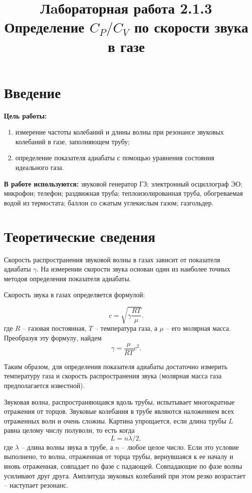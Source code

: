 \documentclass{article}
\date{}
\author{}
\title{Лaбораторная работа 2.1.3 \\ Определение $C_P/C_V$ по скорости звука в газе}
\begin{document}
\maketitle

\section*{Введение}
\textbf{Цель работы:}  \begin{enumerate}
	\item измерение частоты колебаний и длины волны при резонансе звуковых колебаний в газе, заполняющем трубу;
	\item определение показателя адиабаты с помощью уравнения состояния идеального газа.
\end{enumerate}

\textbf{В работе используются:} звуковой генератор ГЗ; электронный осциллограф ЭО; микрофон; телефон; раздвижная труба; теплоизолированная труба, обогреваемая водой из термостата; баллон со сжатым углекислым газом; газгольдер.

\section*{Теоретические сведения}

Скорость распространения звуковой волны в газах зависит от показателя адиабаты $ \gamma $. На измерении скорости звука основан один из наиболее точных методов определения показателя адиабаты.

Скорость звука в газах определяется формулой:

\begin{equation}\label{velocity}
	c=\sqrt{\gamma\frac{RT}{\mu}}.
\end{equation}
где $ R $ -- газовая постоянная, $ T $ -- температура газа, а $ \mu $ -- его молярная масса. Преобразуя эту формулу, найдем
\begin{equation}\label{gamma}
	\boxed{\gamma = \frac{\mu}{RT}c^2}.
\end{equation}

Таким образом, для определения показателя адиабаты достаточно измерить температуру газа и скорость распространения звука (молярная масса газа предполагается известной).

Звуковая волна, распространяющаяся вдоль трубы, испытывает многократные отражения от торцов. Звуковые колебания в трубе являются наложением всех отраженных волн и очень сложны. Картина упрощается, если длина трубы $ L $ равна целому числу полуволн, то есть когда \[ L=n\lambda/2, \] где $ \lambda $ -- длина волны звука в трубе, а $ n $ -- любое целое число. Если это условие выполнено, то волна, отраженная от торца трубы, вернувшаяся к ее началу и вновь отраженная, совпадает по фазе с падающей. Совпадающие по фазе волны усиливают друг друга. Амплитуда звуковых колебаний при этом резко возрастает -- наступает резонанс.
\end{document}
